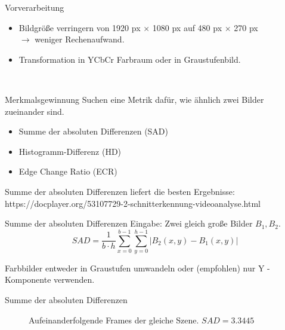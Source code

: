 \documentclass[11pt]{beamer}
\begin{document}
\begin{frame}{Vorverarbeitung}
\begin{itemize}
\item Bildgröße verringern von 1920 px $\times$ 1080 px auf 480 px $\times$ 270 px  \\
$\rightarrow$ weniger Rechenaufwand. 
\item Transformation in YCbCr Farbraum oder in Graustufenbild. 
\end{itemize} 
~\newline
~\newline
\end{frame}

\begin{frame}{Merkmalsgewinnung}
Suchen eine Metrik dafür, wie ähnlich zwei Bilder zueinander sind.
\begin{itemize}
\item Summe der absoluten Differenzen (SAD)
\item Histogramm-Differenz (HD)
\item  Edge Change Ratio (ECR)
\end{itemize}
Summe der absoluten Differenzen liefert die besten Ergebnisse: https://docplayer.org/53107729-2-schnitterkennung-videoanalyse.html
\end{frame}


\begin{frame}{Summe der absoluten Differenzen}
Eingabe: Zwei gleich große Bilder $B_1, B_2$. 
\[ SAD = \dfrac{1}{b\cdot h}\sum_{x=0}^{b-1} \sum_{y=0}^{h-1} | B_2(x,y) - B_1(x,y) | \]

Farbbilder entweder in Graustufen umwandeln oder (empfohlen) nur Y - Komponente verwenden. 
\end{frame}

\begin{frame}{Summe der absoluten Differenzen}
\begin{figure}
\caption{Aufeinanderfolgende Frames der gleiche Szene. $SAD = 3.3445$} 
\end{figure} 
\end{frame}
\end{document}
